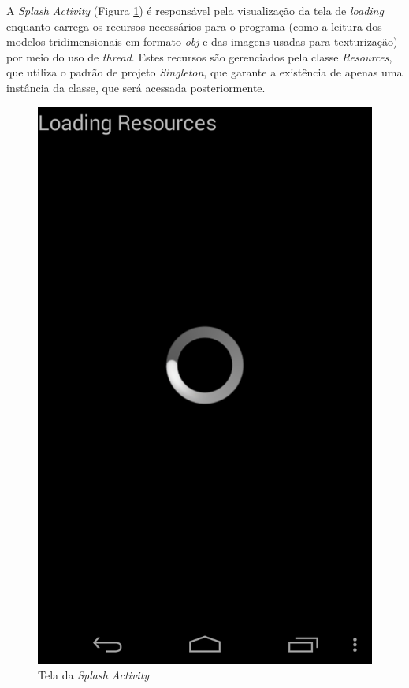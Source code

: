 	A \textit{Splash Activity} (Figura  \ref{splash_act}) é responsável pela visualização da tela de \textit{loading} enquanto carrega os recursos necessários para o programa (como a leitura dos modelos tridimensionais em formato \textit{obj} e das imagens usadas para texturização) por meio do uso de \textit{thread}. Estes recursos são gerenciados pela classe \textit{Resources}, que utiliza o padrão de projeto \textit{Singleton}, que garante a existência de apenas uma instância da classe, que será acessada posteriormente.

	\begin{figure}[ht]
	\centering
		\includegraphics[keepaspectratio=true,scale=0.2]{figuras/splash_act.png}
	\caption{Tela da \textit{Splash Activity}}
	\label{splash_act}
	\end{figure}


